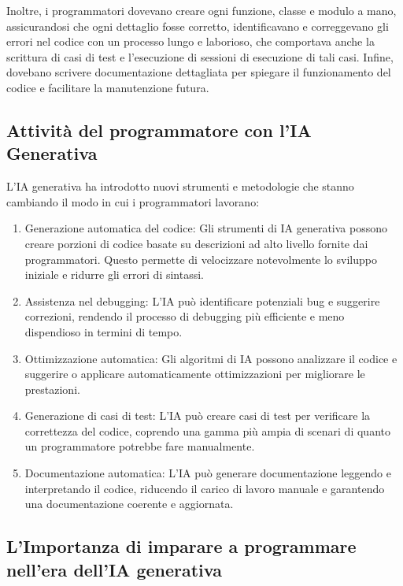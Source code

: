 \documentclass[
  letterpaper,
]{scrbook}
\providecommand{\tightlist}{%
  \setlength{\itemsep}{0pt}\setlength{\parskip}{0pt}}\usepackage{longtable,booktabs,array}
\begin{document}
Inoltre, i programmatori dovevano creare ogni funzione, classe e modulo
a mano, assicurandosi che ogni dettaglio fosse corretto, identificavano
e correggevano gli errori nel codice con un processo lungo e laborioso,
che comportava anche la scrittura di casi di test e l'esecuzione di
sessioni di esecuzione di tali casi. Infine, dovebano scrivere
documentazione dettagliata per spiegare il funzionamento del codice e
facilitare la manutenzione futura.

\subsection{Attività del programmatore con l'IA
Generativa}\label{attivituxe0-del-programmatore-con-lia-generativa}

L'IA generativa ha introdotto nuovi strumenti e metodologie che stanno
cambiando il modo in cui i programmatori lavorano:

\begin{enumerate}
\def\labelenumi{\arabic{enumi}.}
\tightlist
\item
  Generazione automatica del codice: Gli strumenti di IA generativa
  possono creare porzioni di codice basate su descrizioni ad alto
  livello fornite dai programmatori. Questo permette di velocizzare
  notevolmente lo sviluppo iniziale e ridurre gli errori di sintassi.
\item
  Assistenza nel debugging: L'IA può identificare potenziali bug e
  suggerire correzioni, rendendo il processo di debugging più efficiente
  e meno dispendioso in termini di tempo.
\item
  Ottimizzazione automatica: Gli algoritmi di IA possono analizzare il
  codice e suggerire o applicare automaticamente ottimizzazioni per
  migliorare le prestazioni.
\item
  Generazione di casi di test: L'IA può creare casi di test per
  verificare la correttezza del codice, coprendo una gamma più ampia di
  scenari di quanto un programmatore potrebbe fare manualmente.
\item
  Documentazione automatica: L'IA può generare documentazione leggendo e
  interpretando il codice, riducendo il carico di lavoro manuale e
  garantendo una documentazione coerente e aggiornata.
\end{enumerate}

\subsection{L'Importanza di imparare a programmare nell'era dell'IA
generativa}\label{limportanza-di-imparare-a-programmare-nellera-dellia-generativa}
\end{document}
